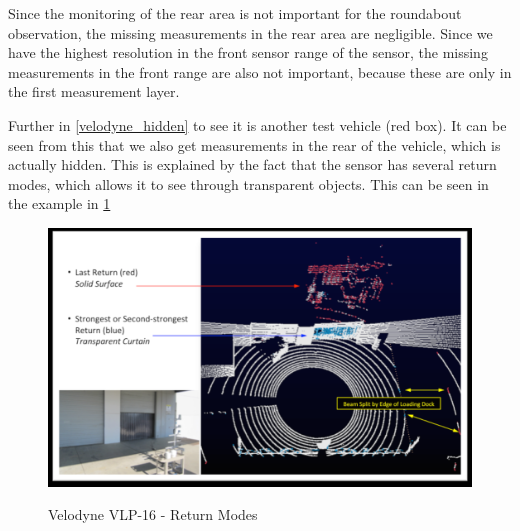 \documentclass[11pt,oneside,openright]{mpreport}
\begin{document}

Since the monitoring of the rear area is not important for the roundabout observation, the missing measurements in the rear area are negligible. Since we have the highest
resolution in the front sensor range of the sensor, the missing measurements in the front range are also not important, because these are only in the first measurement layer.



Further in \cref{velodyne_hidden} to see it is another test vehicle (red box). It can be seen from this that we also get measurements in the rear of the vehicle, which is actually hidden.
This is explained by the fact that the sensor has several return modes, which allows it to see through transparent objects. This can be seen in the example in \cref{vel_trans}

\begin{figure}[!ht]
\caption{Velodyne VLP-16 - Return Modes \cite{manVEL}}
\includegraphics[width=\textwidth]{bilder/velodyne_trans.png}
\label{vel_trans}
\end{figure}
\end{document}
